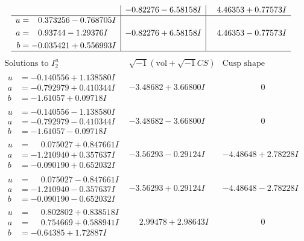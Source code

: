 \documentclass[1p]{elsarticle_modified}
\theoremstyle{definition}
\newcommand{\I}{\sqrt{-1}}
\begin{document}
$$\begin{array}{c|c|c}
 & -0.82276 - 6.58158 I & \phantom{-}4.46353 + 0.77573 I \\ \hline\begin{aligned}
u &= \phantom{-}0.373256 - 0.768705 I \\
a &= \phantom{-}0.93744 - 1.29376 I \\
b &= -0.035421 + 0.556993 I\end{aligned}
 & -0.82276 + 6.58158 I & \phantom{-}4.46353 - 0.77573 I\\
 \hline 
 \end{array}$$\newpage$$\begin{array}{c|c|c}  
\text{Solutions to }I^u_{2}& \I (\text{vol} + \sqrt{-1}CS) & \text{Cusp shape}\\
 \hline 
\begin{aligned}
u &= -0.140556 + 1.138580 I \\
a &= -0.792979 + 0.410344 I \\
b &= -1.61057 + 0.09718 I\end{aligned}
 & -3.48682 + 3.66800 I & \phantom{-0.000000 } 0 \\ \hline\begin{aligned}
u &= -0.140556 - 1.138580 I \\
a &= -0.792979 - 0.410344 I \\
b &= -1.61057 - 0.09718 I\end{aligned}
 & -3.48682 - 3.66800 I & \phantom{-0.000000 } 0 \\ \hline\begin{aligned}
u &= \phantom{-}0.075027 + 0.847661 I \\
a &= -1.210940 + 0.357637 I \\
b &= -0.090190 + 0.652032 I\end{aligned}
 & -3.56293 - 0.29124 I & -4.48648 + 2.78228 I \\ \hline\begin{aligned}
u &= \phantom{-}0.075027 - 0.847661 I \\
a &= -1.210940 - 0.357637 I \\
b &= -0.090190 - 0.652032 I\end{aligned}
 & -3.56293 + 0.29124 I & -4.48648 - 2.78228 I \\ \hline\begin{aligned}
u &= \phantom{-}0.802802 + 0.838518 I \\
a &= \phantom{-}0.754669 + 0.588941 I \\
b &= -0.64385 + 1.72887 I\end{aligned}
 & \phantom{-}2.99478 + 2.98643 I & \phantom{-0.000000 } 0 \\ \hline\begin{aligned}

\end{aligned}
\end{array}$$
\end{document}
